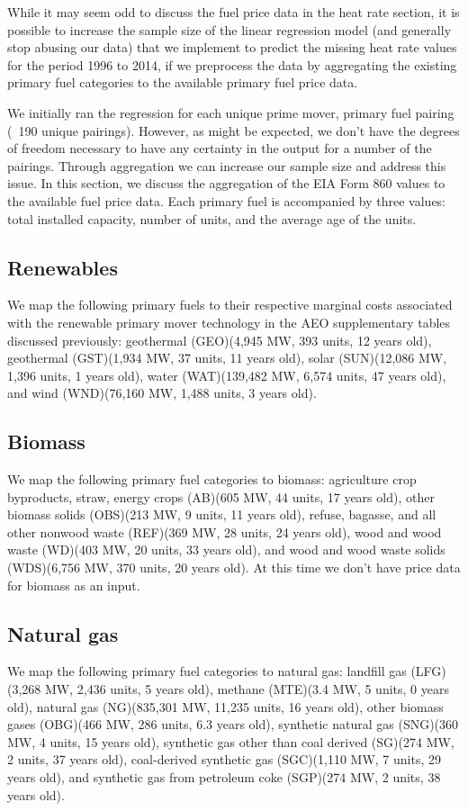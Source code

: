 \documentclass[10pt]{report}
\begin{document}
While it may seem odd to discuss the fuel price data in the heat rate section, it is possible to increase the sample size of the linear regression model (and generally stop abusing our data) that we implement to predict the missing heat rate values for the period 1996 to 2014, if we preprocess the data by aggregating the existing primary fuel categories to the available primary fuel price data.

We initially ran the regression for each unique prime mover, primary fuel pairing (~190 unique pairings). 
However, as might be expected, we don't have the degrees of freedom necessary to have any certainty in the output for a number of the pairings. 
Through aggregation we can increase our sample size and address this issue.
In this section, we discuss the aggregation of the EIA Form 860 values to the available fuel price data.
Each primary fuel is accompanied by three values: total installed capacity, number of units, and the average age of the units.
 
\subsection{Renewables}
We map the following primary fuels to their respective marginal costs associated with the renewable primary mover technology in the AEO supplementary tables discussed previously: geothermal (GEO)(4,945 MW, 393 units, 12 years old), geothermal (GST)(1,934 MW, 37 units, 11 years old), solar (SUN)(12,086 MW, 1,396 units, 1 years old), water (WAT)(139,482 MW, 6,574 units, 47 years old), and wind (WND)(76,160 MW, 1,488 units, 3 years old). 

\subsection{Biomass}
We map the following primary fuel categories to biomass: agriculture crop byproducts, straw, energy crops (AB)(605 MW, 44 units, 17 years old), other biomass solids (OBS)(213 MW, 9 units, 11 years old), refuse, bagasse, and all other nonwood waste (REF)(369 MW, 28 units, 24 years old), wood and wood waste (WD)(403 MW, 20 units, 33 years old), and wood and wood waste solids (WDS)(6,756 MW, 370 units, 20 years old). 
At this time we don't have price data for biomass as an input. 

\subsection{Natural gas}
We map the following primary fuel categories to natural gas: landfill gas (LFG)(3,268 MW, 2,436 units, 5 years old), methane (MTE)(3.4 MW, 5 units, 0 years old), natural gas (NG)(835,301 MW, 11,235 units, 16 years old), other biomass gases (OBG)(466 MW, 286 units, 6.3 years old), synthetic natural gas (SNG)(360 MW, 4 units, 15 years old), synthetic gas other than coal derived (SG)(274 MW, 2 units, 37 years old), coal-derived synthetic gas (SGC)(1,110 MW, 7 units, 29 years old), and synthetic gas from petroleum coke (SGP)(274 MW, 2 units, 38 years old). 
\end{document}
